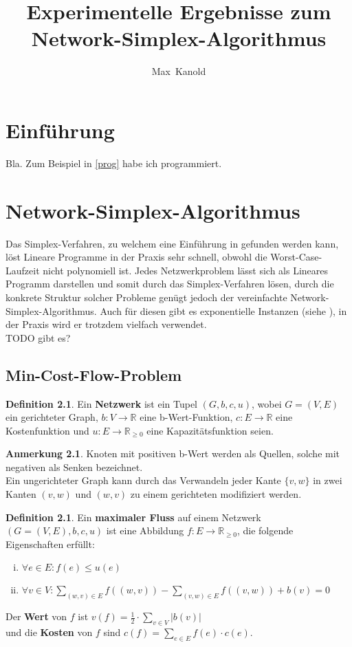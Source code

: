 \documentclass[a4paper,twoside,ngerman]{report}
\author{Max~Kanold}
\title{Experimentelle Ergebnisse zum Network-Simplex-Algorithmus}
\theoremstyle{plain}
\theoremstyle{definition}
\newtheorem{defn}[thm]{Definition}
\newtheorem*{anm}{Anmerkung}
\begin{document}
\maketitle
\tableofcontents

\newpage
\chapter{Einführung}
Bla. Zum Beispiel in \cref{prog} habe ich programmiert.

\newpage
\chapter{Network-Simplex-Algorithmus}
Das Simplex-Verfahren, zu welchem eine Einführung in \cite{NSAbook} gefunden werden kann, löst Lineare Programme in der Praxis sehr schnell, obwohl die Worst-Case-Laufzeit nicht polynomiell ist. Jedes Netzwerkproblem lässt sich als Lineares Programm darstellen und somit durch das Simplex-Verfahren lösen, durch die konkrete Struktur solcher Probleme genügt jedoch der vereinfachte Network-Simplex-Algorithmus. Auch für diesen gibt es exponentielle Instanzen (siehe \cite{Exponential}), in der Praxis wird er trotzdem vielfach verwendet.\\
TODO gibt es?

\section{Min-Cost-Flow-Problem}
\begin{defn}Ein \textbf{Netzwerk} ist ein Tupel $(G,b,c,u)$, wobei $G = (V,E)$ ein gerichteter Graph, $b : V\rightarrow\mathbb{R}$ eine b-Wert-Funktion, $c : E\rightarrow\mathbb{R}$ eine Kostenfunktion und $u : E\rightarrow\mathbb{R}_{\geq 0}$ eine Kapazitätsfunktion seien.\end{defn}
\begin{anm}Knoten mit positiven b-Wert werden als Quellen, solche mit negativen als Senken bezeichnet.\\
Ein ungerichteter Graph kann durch das Verwandeln jeder Kante $\{v,w\}$ in zwei Kanten $(v,w)$ und $(w,v)$ zu einem gerichteten modifiziert werden.\end{anm}

\begin{defn}\label{DefMaxFlow}Ein \textbf{maximaler Fluss} auf einem Netzwerk $(G=(V,E),b,c,u)$ ist eine Abbildung $f : E\rightarrow\mathbb{R}_{\geq 0}$, die folgende Eigenschaften erfüllt:
\begin{enumerate}[(i)]
\item $\forall e\in E : f(e)\leq u(e) $
\item $\forall v\in V : \sum_{(w,v)\in E} f((w,v)) - \sum_{(v,w)\in E} f((v,w)) + b(v) = 0$\label{DefMaxFlowII}
\end{enumerate}
Der \textbf{Wert} von $f$ ist
$v(f) = \frac{1}{2}\cdot\sum_{v\in V} |b(v)|$\\
und die \textbf{Kosten} von $f$ sind
$c(f) = \sum_{e\in E} f(e)\cdot c(e)$.
\end{defn}
\end{document}
